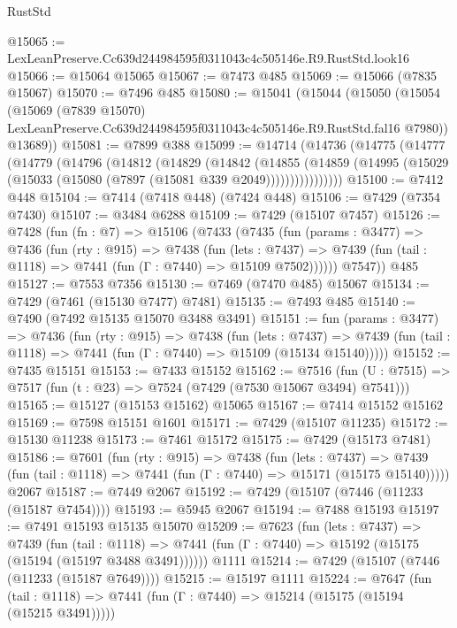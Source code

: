 \begin{lexlean}{RustStd}
\begin{coremodule}
@15065 := LexLeanPreserve.Cc639d244984595f0311043c4c505146e.R9.RustStd.look16
@15066 := @15064 @15065
@15067 := @7473 @485
@15069 := @15066 (@7835 @15067)
@15070 := @7496 @485
@15080 := @15041
    (@15044
      (@15050
        (@15054
          (@15069
            (@7839 @15070)
            LexLeanPreserve.Cc639d244984595f0311043c4c505146e.R9.RustStd.fal16
            @7980))
        @13689))
@15081 := @7899 @388
@15099 := @14714
    (@14736
      (@14775
        (@14777
          (@14779
            (@14796
              (@14812
                (@14829
                  (@14842
                    (@14855
                      (@14859
                        (@14995 (@15029 (@15033 (@15080 (@7897 (@15081 @339 @2049))))))))))))))))
@15100 := @7412 @448
@15104 := @7414 (@7418 @448) (@7424 @448)
@15106 := @7429 (@7354 @7430)
@15107 := @3484 @6288
@15109 := @7429 (@15107 @7457)
@15126 := @7428
    (fun (fn : @7) =>
    @15106
      (@7433
        (@7435
          (fun (params : @3477) =>
          @7436
            (fun (rty : @915) =>
            @7438
              (fun (lets : @7437) =>
              @7439 (fun (tail : @1118) => @7441 (fun (Γ : @7440) => @15109 @7502))))))
        @7547))
    @485
@15127 := @7553 @7356
@15130 := @7469 (@7470 @485) @15067
@15134 := @7429 (@7461 (@15130 @7477) @7481)
@15135 := @7493 @485
@15140 := @7490 (@7492 @15135 @15070 @3488 @3491)
@15151 := fun (params : @3477) =>
  @7436
    (fun (rty : @915) =>
    @7438
      (fun (lets : @7437) =>
      @7439 (fun (tail : @1118) => @7441 (fun (Γ : @7440) => @15109 (@15134 @15140)))))
@15152 := @7435 @15151
@15153 := @7433 @15152
@15162 := @7516
    (fun (U : @7515) => @7517 (fun (t : @23) => @7524 (@7429 (@7530 @15067 @3494) @7541)))
@15165 := @15127 (@15153 @15162) @15065
@15167 := @7414 @15152 @15162
@15169 := @7598 @15151 @1601
@15171 := @7429 (@15107 @11235)
@15172 := @15130 @11238
@15173 := @7461 @15172
@15175 := @7429 (@15173 @7481)
@15186 := @7601
    (fun (rty : @915) =>
    @7438
      (fun (lets : @7437) =>
      @7439 (fun (tail : @1118) => @7441 (fun (Γ : @7440) => @15171 (@15175 @15140)))))
    @2067
@15187 := @7449 @2067
@15192 := @7429 (@15107 (@7446 (@11233 (@15187 @7454))))
@15193 := @5945 @2067
@15194 := @7488 @15193
@15197 := @7491 @15193 @15135 @15070
@15209 := @7623
    (fun (lets : @7437) =>
    @7439
      (fun (tail : @1118) =>
      @7441 (fun (Γ : @7440) => @15192 (@15175 (@15194 (@15197 @3488 @3491))))))
    @1111
@15214 := @7429 (@15107 (@7446 (@11233 (@15187 @7649))))
@15215 := @15197 @1111
@15224 := @7647
    (fun (tail : @1118) => @7441 (fun (Γ : @7440) => @15214 (@15175 (@15194 (@15215 @3491)))))

\end{coremodule}
\end{lexlean}
